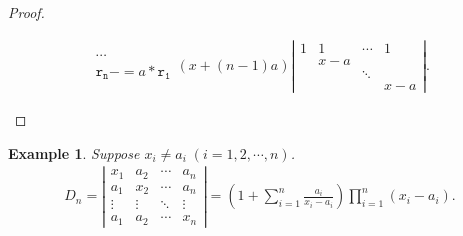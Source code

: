 \documentclass{report}
\newtheorem{example}{Example}[section]
\theoremstyle{nonumberplain}
\newtheorem{proof}{Proof.}
\newcommand{\minuseq}{\mathrel{{-}{=}}}
\begin{document}
\begin{proof}
\begin{enumerate}
\begin{equation*}
\begin{aligned}
{{\begin{array}{l}
					\cdots\\ 
					\mathtt{r_n\minuseq \mathit{a}* r_1}
				\end{array}}}
				\left(x+(n-1)a\right)\left|
				\begin{array}{cccc}
				1 & 1 & \cdots & 1 \\
				  & x-a &   &   \\
				  &   & \ddots &   \\
				  &   &   & x-a
			\end{array}\right|.
			\end{aligned}
		\end{equation*}
	\end{enumerate}
\end{proof}
\begin{example} Suppose $x_i\ne a_i\;(i=1,2,\cdots,n)$.
	\begin{equation*}		
		\begin{aligned}
		D_{n}=\left|\begin{array}{cccc}
			x_{1} & a_{2} & \cdots & a_{n} \\
			a_{1} & x_{2} & \cdots & a_{n} \\
			\vdots & \vdots & \ddots & \vdots \\
			a_{1} & a_{2} & \cdots & x_{n}
		\end{array}\right|=\left(1+\sum_{i=1}^{n} \frac{a_{i}}{x_{i}-a_{i}}\right) \prod_{i=1}^{n}\left(x_{i}-a_{i}\right).
		\end{aligned}
	\end{equation*}
\end{example}
\end{document}
